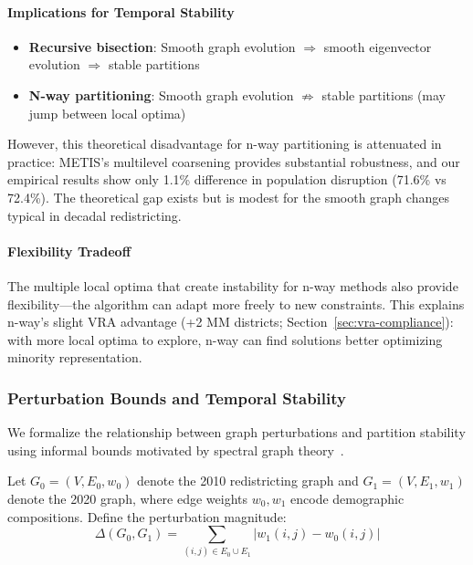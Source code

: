 \paragraph{Implications for Temporal Stability}
\begin{itemize}
\item \textbf{Recursive bisection}: Smooth graph evolution $\Rightarrow$ smooth eigenvector evolution $\Rightarrow$ stable partitions
\item \textbf{N-way partitioning}: Smooth graph evolution $\not\Rightarrow$ stable partitions (may jump between local optima)
\end{itemize}

However, this theoretical disadvantage for n-way partitioning is attenuated in practice: METIS's multilevel coarsening provides substantial robustness, and our empirical results show only 1.1\% difference in population disruption (71.6\% vs 72.4\%). The theoretical gap exists but is modest for the smooth graph changes typical in decadal redistricting.

\paragraph{Flexibility Tradeoff} The multiple local optima that create instability for n-way methods also provide flexibility---the algorithm can adapt more freely to new constraints. This explains n-way's slight VRA advantage (+2 MM districts; Section~\ref{sec:vra-compliance}): with more local optima to explore, n-way can find solutions better optimizing minority representation.

\subsubsection{Perturbation Bounds and Temporal Stability}

We formalize the relationship between graph perturbations and partition stability using informal bounds motivated by spectral graph theory~\citep{vonluxburg2007tutorial, chung1997spectral}.

Let $G_0 = (V, E_0, w_0)$ denote the 2010 redistricting graph and $G_1 = (V, E_1, w_1)$ denote the 2020 graph, where edge weights $w_0, w_1$ encode demographic compositions. Define the perturbation magnitude:
\begin{equation}
\Delta(G_0, G_1) = \sum_{(i,j) \in E_0 \cup E_1} |w_1(i,j) - w_0(i,j)|
\end{equation}

